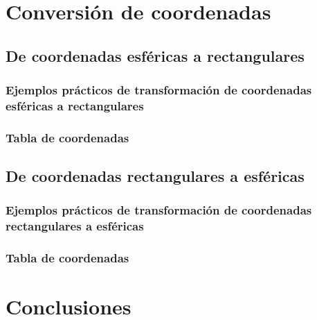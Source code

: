 \documentclass[letterpaper,14pt]{extreport} %
\begin{document}
    \section{Conversión de coordenadas}
      

      \subsection{De coordenadas esféricas a rectangulares}
          

          \subsubsection{Ejemplos prácticos de transformación de coordenadas esféricas a rectangulares}
          

          \subsubsection{Tabla de coordenadas}
          

      \subsection{De coordenadas rectangulares a esféricas}
          

          \subsubsection{Ejemplos prácticos de transformación de coordenadas rectangulares a esféricas}
          

          \subsubsection{Tabla de coordenadas}
          

    \section{Conclusiones}
      



  \medskip

  \printbibliography[title={Referencias}]
\end{document}
